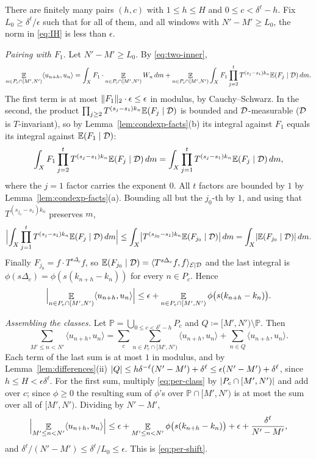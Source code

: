 There are finitely many pairs $(h,c)$ with $1 \leq h \leq H$ and $0 \leq c < \delta^{\ell} - h$.
Fix $L_0 \geq \delta^{\ell}/\epsilon$ such that for all of them, and all windows with
$N' - M' \geq L_0$, the norm in \eqref{eq:IH} is less than $\epsilon$.

\emph{Pairing with $F_1$.}  Let $N' - M' \geq L_0$.  By \eqref{eq:two-inner},
\[
  \mathop{\mathbb{E}}_{n \in P_c \cap [M',N')} \langle u_{n+h},u_n\rangle
    = \int_X F_1 \cdot \mathop{\mathbb{E}}_{n \in P_c \cap [M',N')} W_n \, dm
    + \mathop{\mathbb{E}}_{n \in P_c \cap [M',N')} \int_X F_1 \prod_{j=2}^{t} T^{(s_j-s_1)k_n}\mathbb{E}(F_j\mid\mathcal{D})\,dm .
\]
The first term is at most $\lVert F_1 \rVert_2 \cdot \epsilon \leq \epsilon$ in modulus, by
Cauchy--Schwarz.  In the second, the product $\prod_{j \geq 2} T^{(s_j-s_1)k_n}\mathbb{E}(F_j\mid\mathcal{D})$
is bounded and $\mathcal{D}$-measurable ($\mathcal{D}$ is $T$-invariant), so by
Lemma~\ref{lem:condexp-facts}(b) its integral against $F_1$ equals its integral against
$\mathbb{E}(F_1\mid\mathcal{D})$:
\[
  \int_X F_1 \prod_{j=2}^{t} T^{(s_j-s_1)k_n}\mathbb{E}(F_j\mid\mathcal{D})\,dm
    = \int_X \prod_{j=1}^{t} T^{(s_j-s_1)k_n}\mathbb{E}(F_j\mid\mathcal{D})\,dm ,
\]
where the $j = 1$ factor carries the exponent $0$.  All $t$ factors are bounded by $1$ by
Lemma~\ref{lem:condexp-facts}(a).  Bounding all but the $j_0$-th by $1$, and using that
$T^{(s_{j_0}-s_1)k_n}$ preserves $m$,
\[
  \Bigl\lvert \int_X \prod_{j=1}^{t} T^{(s_j-s_1)k_n}\mathbb{E}(F_j\mid\mathcal{D})\,dm \Bigr\rvert
    \leq \int_X \bigl\lvert T^{(s_{j_0}-s_1)k_n}\mathbb{E}(F_{j_0}\mid\mathcal{D}) \bigr\rvert \,dm
    = \int_X \lvert \mathbb{E}(F_{j_0}\mid\mathcal{D}) \rvert\,dm .
\]
Finally $F_{j_0} = f \cdot T^{s\Delta_c} f$, so $\mathbb{E}(F_{j_0}\mid\mathcal{D}) = \langle T^{s\Delta_c}f, f \rangle_{\mathcal{E} \mid \mathcal{D}}$
and the last integral is $\phi(s\Delta_c) = \phi(s(k_{n+h}-k_n))$ for every $n \in P_c$.  Hence
\begin{equation}
  \label{eq:per-class}
  \Bigl\lvert \mathop{\mathbb{E}}_{n \in P_c \cap [M',N')} \langle u_{n+h},u_n\rangle \Bigr\rvert
    \leq \epsilon + \mathop{\mathbb{E}}_{n \in P_c \cap [M',N')} \phi\bigl(s(k_{n+h}-k_n)\bigr) .
\end{equation}

\emph{Assembling the classes.}  Let $\mathbb P = \bigcup_{0 \leq c < \delta^{\ell} - h} P_c$ and
$Q \coloneqq [M',N') \setminus \mathbb P$.  Then
\[
  \sum_{M' \leq n < N'} \langle u_{n+h},u_n\rangle
    = \sum_{c} \sum_{n \in P_c \cap [M',N')} \langle u_{n+h},u_n\rangle + \sum_{n \in Q} \langle u_{n+h},u_n\rangle .
\]
Each term of the last sum is at most $1$ in modulus, and by Lemma~\ref{lem:differences}(ii)
$\lvert Q \rvert \leq h\delta^{-\ell}(N'-M') + \delta^{\ell} \leq \epsilon(N'-M') + \delta^{\ell}$, since
$h \leq H < \epsilon\delta^{\ell}$.  For the first sum, multiply \eqref{eq:per-class} by
$\lvert P_c \cap [M',N') \rvert$ and add over $c$; since $\phi \geq 0$ the resulting sum of $\phi$'s
over $\mathbb P \cap [M',N')$ is at most the sum over all of $[M',N')$.  Dividing by $N'-M'$,
\[
  \Bigl\lvert \mathop{\mathbb{E}}_{M' \leq n < N'} \langle u_{n+h}, u_n \rangle \Bigr\rvert
    \leq \epsilon + \mathop{\mathbb{E}}_{M' \leq n < N'} \phi\bigl(s(k_{n+h}-k_n)\bigr) + \epsilon + \frac{\delta^{\ell}}{N'-M'} ,
\]
and $\delta^{\ell}/(N'-M') \leq \delta^{\ell}/L_0 \leq \epsilon$.  This is \eqref{eq:per-shift}.

